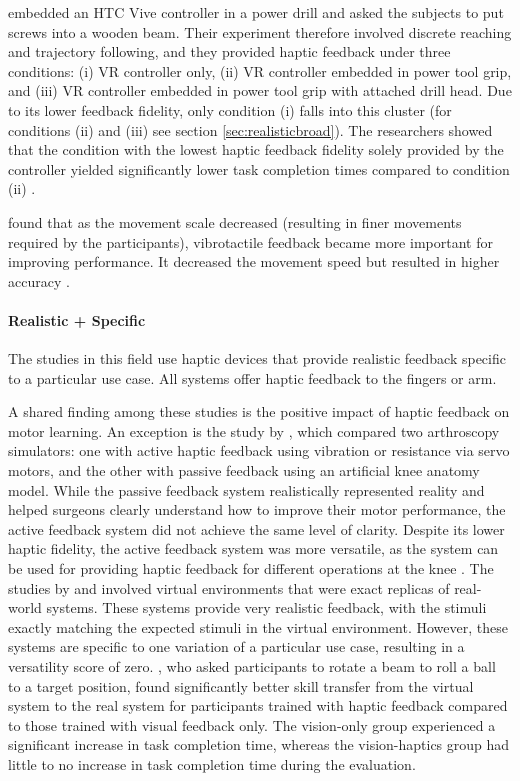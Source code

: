 \cite{Yang2023} embedded an HTC Vive controller in a power drill and asked the subjects to put screws into a wooden beam. Their experiment therefore involved discrete reaching and trajectory following, and they provided haptic feedback under three conditions: (i) VR controller only, (ii) VR controller embedded in power tool grip, and (iii) VR controller embedded in power tool grip with attached drill head. Due to its lower feedback fidelity, only condition (i) falls into this cluster (for conditions (ii) and (iii) see section \ref{sec:realisticbroad}). The researchers showed that the condition with the lowest haptic feedback fidelity solely provided by the controller yielded significantly lower task completion times compared to condition (ii) \cite{Yang2023}.

\cite{Vasudevan2020} found that as the movement scale decreased (resulting in finer movements required by the participants), vibrotactile feedback became more important for improving performance. It decreased the movement speed but resulted in higher accuracy \cite{Vasudevan2020}. 

\paragraph{Realistic + Specific} \label{sec:realisticspecific}

The studies in this field use haptic devices that provide realistic feedback specific to a particular use case. All systems offer haptic feedback to the fingers or arm.

A shared finding among these studies is the positive impact of haptic feedback on motor learning. An exception is the study by \cite{Vaghela2021}, which compared two arthroscopy simulators: one with active haptic feedback using vibration or resistance via servo motors, and the other with passive feedback using an artificial knee anatomy model. While the passive feedback system realistically represented reality and helped surgeons clearly understand how to improve their motor performance, the active feedback system did not achieve the same level of clarity. Despite its lower haptic fidelity, the active feedback system was more versatile, as the system can be used for providing haptic feedback for different operations at the knee \cite{Vaghela2021}.
The studies by \cite{Vaghela2021} and \cite{Huang2006} involved virtual environments that were exact replicas of real-world systems. These systems provide very realistic feedback, with the stimuli exactly matching the expected stimuli in the virtual environment. However, these systems are specific to one variation of a particular use case, resulting in a versatility score of zero. \cite{Huang2006}, who asked participants to rotate a beam to roll a ball to a target position, found significantly better skill transfer from the virtual system to the real system for participants trained with haptic feedback compared to those trained with visual feedback only. The vision-only group experienced a significant increase in task completion time, whereas the vision-haptics group had little to no increase in task completion time during the evaluation. 

